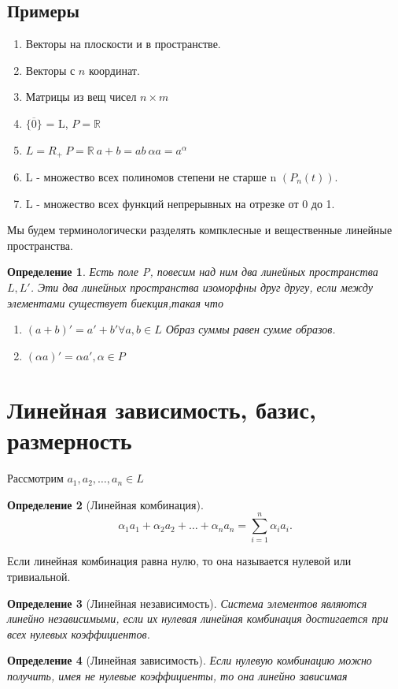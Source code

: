 \documentclass{scrartcl}
\newtheorem{definition}{Определение}
\begin{document}
    \subsection{Примеры}
    \begin{enumerate}
        \item Векторы на плоскости и в пространстве.
        \item Векторы с $n$ координат.
        \item Матрицы из вещ чисел  $n \times m$
        \item  $\{\overline{0}\}$ = L, $P = \mathbb{R}$
        \item $L =R_{+} ~ P = \mathbb{R} ~ a + b = ab ~ \alpha a = a^{\alpha}$
        \item L - множество всех полиномов степени не старше n $(P_{n}(t))$.
        \item L - множество всех функций непрерывных на отрезке от 0 до 1.
    \end{enumerate}
    Мы будем терминологически разделять компклесные и вещественные линейные пространства.
    \begin{definition}
        Есть поле P, повесим над ним два линейных пространства $L, L'$. Эти два линейных пространства
        изоморфны друг другу, если между элементами существует биекция,такая что
         \begin{enumerate}
            \item $(a + b)' = a' + b' \forall  a, b \in L$ Образ суммы равен сумме образов.
            \item $(\alpha a)' = \alpha a', \alpha \in P$
        \end{enumerate}
    \end{definition}
    \section{Линейная зависимость, базис, размерность}
    Рассмотрим $a_1,a_2,\dots,a_{n} \in L$
    \begin{definition}[Линейная комбинация]
         \[
         \alpha_1 a_1 + \alpha_2a_2 + \dots + \alpha_{n}a_{n} = \sum_{i=1}^{n} \alpha_{i} a_{i}
         .\] 
     \end{definition}
     Если линейная комбинация равна нулю, то она называется нулевой или тривиальной.
     \begin{definition}[Линейная независимость]
         Система элементов являются линейно независимыми, если их нулевая линейная комбинация достигается при всех нулевых коэффициентов.
     \end{definition}
     \begin{definition}[Линейная зависимость]
         Если нулевую комбинацию можно получить, имея не нулевые коэффициенты, то она
         линейно зависимая
     \end{definition}
\end{document}
